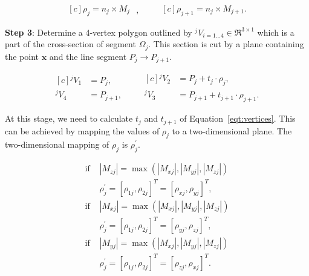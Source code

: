\begin{equation}
\begin{aligned}[c]
\rho_j = n_j \times M_j
\end{aligned}
\mbox{ , }
\qquad
\begin{aligned}[c]
\rho_{j+1} = n_j \times M_{j+1} \mbox{.}
\end{aligned}
\label{eqt:rho}
\end{equation}

\noindent \textbf{Step 3}:
Determine a 4-vertex polygon outlined by \mbox{${^jV}_{i=1...4}\in \Re^{3 \times 1}$} which is a part of the cross-section of segment $\Omega_j$.
This section is cut by a plane containing the point $\boldsymbol{x}$ and the line segment $P_j \rightarrow P_{j+1}$.

\begin{equation}
\begin{aligned}[c]
{^jV}_1 &= P_j \mbox{,} \\
{^jV}_4 &= P_{j+1} \mbox{,}
\end{aligned}
\qquad
\begin{aligned}[c]
{^jV}_2 &= P_j + t_j \cdot \rho_j \mbox{,} \\
{^jV}_3 &= P_{j+1} + t_{j+1} \cdot\rho_{j+1} \mbox{.}
\end{aligned}
\label{eqt:vertices}
\end{equation}

At this stage, we need to calculate $t_j$ and $t_{j+1}$ of Equation~\ref{eqt:vertices}.
This can be achieved by mapping the values of $\rho_j$ to a two-dimensional plane.
The two-dimensional mapping of $\rho_j$ is $\rho^{\prime}_j$.

\begin{equation}
\begin{aligned}
\mbox{if } &|M_{zj}| = \max \left ( {|M_{xj}|,|M_{yj}|,|M_{zj}|} \right ) \\
&\rho^{\prime}_j = [\rho_{1j},\rho_{2j}]^T = [\rho_{xj},\rho_{yj}]^T \mbox{,} \\
\mbox{if } &|M_{xj}| = \max \left ( {|M_{xj}|,|M_{yj}|,|M_{zj}|} \right ) \\
&\rho^{\prime}_j = [\rho_{1j},\rho_{2j}]^T = [\rho_{yj},\rho_{zj}]^T \mbox{,} \\
\mbox{if } &|M_{yj}| = \max \left ( {|M_{xj}|,|M_{yj}|,|M_{zj}|} \right ) \\
&\rho^{\prime}_j = [\rho_{1j},\rho_{2j}]^T = [\rho_{zj},\rho_{xj}]^T \mbox{.}
\end{aligned}
\label{eqt:rhoprocess}
\end{equation}

